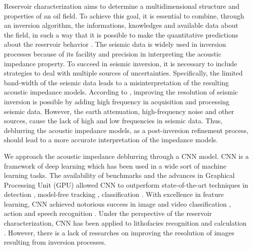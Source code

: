 \documentclass[conference,compsoc]{IEEEtran}
\begin{document}
Reservoir characterization aims to determine a multidimensional
structure and properties of an oil field. To achieve this goal, it is essential to combine, through an
inversion algorithm, the informations, knowledges and available data about the field,
in such a way that it is possible to make the
quantitative predictions about the reservoir behavior \cite{buiting}.
The seismic data is widely used in inversion processes because of its facility and precision
in interpreting the acoustic impedance property.
To succeed in seismic inversion, it is necessary to include strategies to deal with multiple
sources of uncertainties. Specifically, the limited band-width of the seismic data leads to
a misinterpretation of the resulting acoustic impedance models.
According to \cite{xiaoiu}, improving the resolution of seismic inversion is
possible by adding high frequency in acquisition and processing seismic data.
However, the earth attenuation, high-frequency noise and other sources, cause
the lack of high and low frequencies in seismic data. 
Thus, deblurring the acoustic impedance models, as a post-inversion refinement process, should lead to a more accurate
interpretation of the impedance models.

We approach  the acoustic impedance deblurring through
a CNN model. CNN is a framework of deep learning which has been
used in a wide sort of machine learning tasks. The availability of benchmarks
\cite{Russakovsky} and the advances in Graphical Processing Unit (GPU) \cite{Buduma15}
allowed CNN to outperform state-of-the-art techniques in detection \cite{Girshick,Bell}, model-free
tracking \cite{Nam}, classification \cite{He}. With excellence in feature learning,
CNN achieved notorious success in image and video classification \cite{Krizhevsky, AbdelHamid}, action  and speech recognition \cite{Farfade, S_Ji}.
Under the perspective of the reservoir characterization, CNN has been applied to lithofacies recognition
\cite{qian} and calculation \cite{Liu}. However, there is a lack of researches on improving the resolution of
images resulting from inversion processes.
\end{document}

